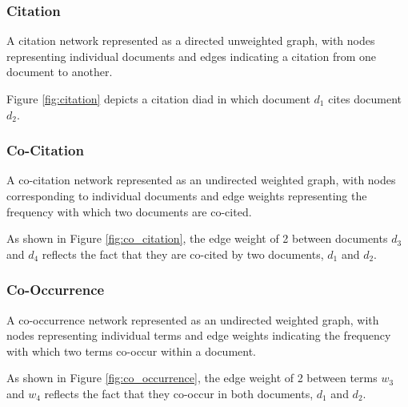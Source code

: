 
\subsubsection{Citation}

A citation network represented as a directed unweighted graph, with nodes representing individual documents and edges indicating a citation from one document to another.



Figure \ref{fig:citation} depicts a citation diad in which document $d_1$ cites document $d_2$.

\subsubsection{Co-Citation}

A co-citation network represented as an undirected weighted graph, with nodes corresponding to individual documents and edge weights representing the frequency with which two documents are co-cited.

\citep{small1973,small1974,griffith1974,small1977,small1979}



As shown in Figure \ref{fig:co_citation}, the edge weight of 2 between documents $d_3$ and $d_4$ reflects the fact that they are co-cited by two documents, $d_1$ and $d_2$.

\subsubsection{Co-Occurrence}

A co-occurrence network represented as an undirected weighted graph, with nodes representing individual terms and edge weights indicating the frequency with which two terms co-occur within a document.



As shown in Figure \ref{fig:co_occurrence}, the edge weight of 2 between terms $w_3$ and $w_4$ 
reflects the fact that they co-occur in both documents, $d_1$ and $d_2$.
